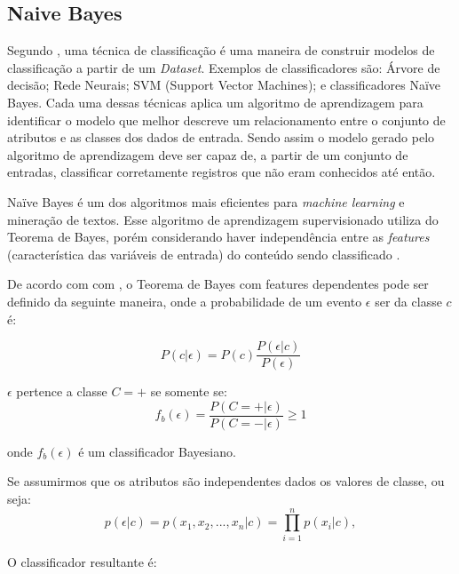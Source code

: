 \subsection{Naive Bayes}
Segundo , uma técnica de classificação é uma maneira de construir modelos de classificação a partir de um \textit{Dataset}. Exemplos de classificadores são: Árvore de decisão; Rede Neurais; SVM (Support Vector Machines); e classificadores Naïve Bayes.
Cada uma dessas técnicas aplica um algoritmo de aprendizagem para identificar o modelo que melhor descreve um relacionamento entre o conjunto de atributos e as classes dos dados de entrada. Sendo assim o modelo gerado pelo algoritmo de aprendizagem deve ser capaz de, a partir de um conjunto de entradas, classificar corretamente registros que não eram conhecidos até então.

Naïve Bayes é um dos algoritmos mais eficientes para \textit{machine learning} e mineração de textos. Esse algoritmo de aprendizagem supervisionado utiliza do Teorema de Bayes, porém considerando haver independência entre as \textit{features} (característica das variáveis de entrada) do conteúdo sendo classificado \cite{zhang2004optimalitybayes}.

De acordo com com , o Teorema de Bayes com features dependentes pode ser definido da seguinte maneira, onde a probabilidade de um evento $\epsilon$ ser da classe $c$ é:

\begin{equation}
\label{eq:bayes_classic}
 P(c|\epsilon) = P(c ) \frac{P(\epsilon |c)}{P(\epsilon)}
\end{equation}

$\epsilon$ pertence a classe $C = +$ se somente se:
\begin{equation}
\label{eq:bayes_classic}
 {f_b}(\epsilon) =  \frac{P(C = + | \epsilon)}{P(C = - | \epsilon)} \geq 1
\end{equation}

onde ${f_b}(\epsilon)$ é um classificador Bayesiano.

Se assumirmos que os atributos são independentes dados os valores de classe, ou seja:
\begin{equation}
\label{eq:naive_bayes}
 {p}(\epsilon|c) =  {p}({x_1, x_2, ..., x_n}|c) = \prod_{i=1}^{n} {p}(x_i|c),
\end{equation}

O classificador resultante é:

